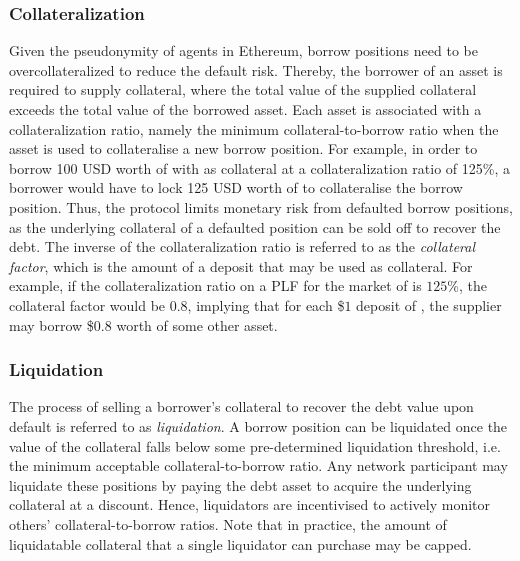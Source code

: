 \subsubsection{Collateralization}
Given the pseudonymity of agents in Ethereum, borrow positions need to be overcollateralized to reduce the default risk.
Thereby, the borrower of an asset is required to supply collateral, where the total value of the supplied collateral exceeds the total value of the borrowed asset.
Each asset is associated with a collateralization ratio, namely the minimum collateral-to-borrow ratio when the asset is used to collateralise a new borrow position.
For example, in order to borrow 100 USD worth of  with  as collateral at a collateralization ratio of 125\%, a borrower would have to lock 125 USD worth of  to collateralise the borrow position.
Thus, the protocol limits monetary risk from defaulted borrow positions, as the underlying collateral of a defaulted position can be sold off to recover the debt.
The inverse of the collateralization ratio is referred to as the \textit{collateral factor}, which is the amount of a deposit that may be used as collateral.
For example, if the collateralization ratio on a PLF for the market of  is $125$\%, the collateral factor would be $0.8$, implying that for each \$$1$ deposit of , the supplier may borrow \$$0.8$ worth of some other asset.

\subsubsection{Liquidation}
The process of selling a borrower's collateral to recover the debt value upon default is referred to as \textit{liquidation}.
A borrow position can be liquidated once the value of the collateral falls below some pre-determined liquidation threshold, i.e. the minimum acceptable collateral-to-borrow ratio.
Any network participant may liquidate these positions by paying the debt asset to acquire the underlying collateral at a discount.
Hence, liquidators are incentivised to actively monitor others' collateral-to-borrow ratios.
Note that in practice, the amount of liquidatable collateral that a single liquidator can purchase may be capped.

